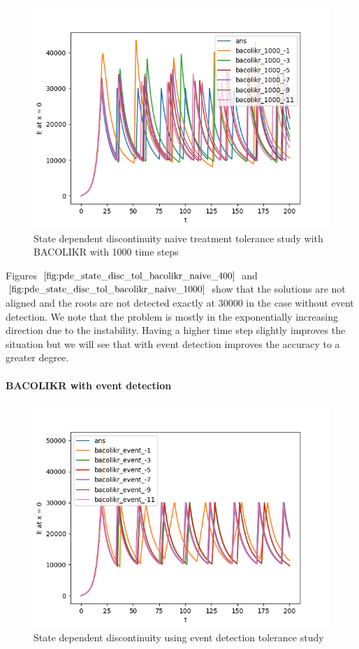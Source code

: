 \documentclass{article}
\begin{document}
\begin{figure}[H]
\centering
\includegraphics[width=0.7\linewidth]{./figures/pde_state_disc_tol_bacolikr_naive_1000}
\caption{State dependent discontinuity naive treatment tolerance study with BACOLIKR with 1000 time steps}
\label{fig:pde_state_disc_tol_bacolikr_naive_1000}
\end{figure}

Figures $\ref{fig:pde_state_disc_tol_bacolikr_naive_400}$ and $\ref{fig:pde_state_disc_tol_bacolikr_naive_1000}$ show that the solutions are not aligned and the roots are not detected exactly at 30000 in the case without event detection. We note that the problem is mostly in the exponentially increasing direction due to the instability. Having a higher time step slightly improves the situation but we will see that with event detection improves the accuracy to a greater degree.

\paragraph{BACOLIKR with event detection}
\begin{figure}[H]
\centering
\includegraphics[width=0.7\linewidth]{./figures/pde_state_disc_tol_event}
\caption{State dependent discontinuity using event detection tolerance study}
\label{fig:pde_state_disc_tol_event}
\end{figure}
\end{document}
